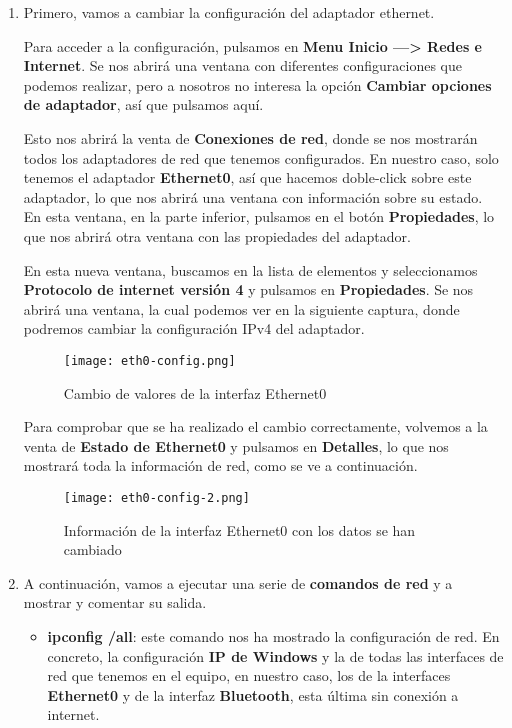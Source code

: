 \begin{enumerate}
    \item Primero, vamos a cambiar la configuración del adaptador ethernet.

    Para acceder a la configuración, pulsamos en \textbf{Menu Inicio ---> Redes e Internet}. Se nos abrirá una ventana con diferentes configuraciones que podemos realizar, pero a nosotros no interesa la opción \textbf{Cambiar opciones de adaptador}, así que pulsamos aquí.

    Esto nos abrirá la venta de \textbf{Conexiones de red}, donde se nos mostrarán todos los adaptadores de red que tenemos configurados. En nuestro caso, solo tenemos el adaptador \textbf{Ethernet0}, así que hacemos doble-click sobre este adaptador, lo que nos abrirá una ventana con información sobre su estado. En esta ventana, en la parte inferior, pulsamos en el botón \textbf{Propiedades}, lo que nos abrirá otra ventana con las propiedades del adaptador.

    En esta nueva ventana, buscamos en la lista de elementos y seleccionamos \textbf{Protocolo de internet versión 4} y pulsamos en \textbf{Propiedades}. Se nos abrirá una ventana, la cual podemos ver en la siguiente captura, donde podremos cambiar la configuración IPv4 del adaptador.

    \begin{figure}[H]
        \centering
        \texttt{[image: eth0-config.png]}
        \caption{Cambio de valores de la interfaz Ethernet0}
    \end{figure}

    Para comprobar que se ha realizado el cambio correctamente, volvemos a la venta de \textbf{Estado de Ethernet0} y pulsamos en \textbf{Detalles}, lo que nos mostrará toda la información de red, como se ve a continuación.

    \begin{figure}[H]
        \centering
        \texttt{[image: eth0-config-2.png]}
        \caption{Información de la interfaz Ethernet0 con los datos se han cambiado}
    \end{figure}

    \item A continuación, vamos a ejecutar una serie de \textbf{comandos de red} y a mostrar y comentar su salida.
    \begin{itemize}
        \item \textbf{ipconfig /all}: este comando nos ha mostrado la configuración de red. En concreto, la configuración \textbf{IP de Windows} y la de todas las interfaces de red que tenemos en el equipo, en nuestro caso, los de la interfaces \textbf{Ethernet0} y de la interfaz \textbf{Bluetooth}, esta última sin conexión a internet.


\end{itemize}
\end{enumerate}
